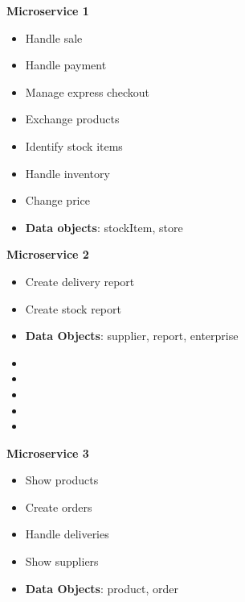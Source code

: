 \begin{multicols}{3}
	\textbf{Microservice 1}
	\begin{flushleft}
	\begin{itemize}[noitemsep]
	\item Handle sale
	\item Handle payment
	\item Manage express checkout
	\item Exchange products
	\item Identify stock items
	\item Handle inventory
	\item Change price
	\item \textbf{Data objects}: stockItem, store
	\end{itemize}
	\end{flushleft}


	\vfill
	\columnbreak
	\textbf{Microservice 2}
	\begin{flushleft}
	\begin{itemize}[noitemsep]
	\item Create delivery report
	\item Create stock report
	\item \textbf{Data Objects}: supplier, report, enterprise
    \item[]
    \item[]
    \item[]
    \item[]
    \item[]
	\end{itemize}
	\end{flushleft}
	
	
	\vfill
	\columnbreak
	\textbf{Microservice 3}
	\begin{flushleft}
	\begin{itemize}[noitemsep]
		\item Show products
		\item Create orders
		\item Handle deliveries
		\item Show suppliers
		\item \textbf{Data Objects}: product, order
	\end{itemize}
\end{flushleft}
\end{multicols}











